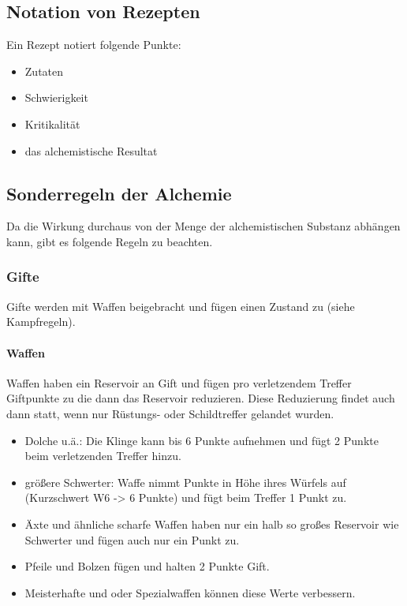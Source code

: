 \documentclass{article}
\begin{document}
\begin{center}
\subsection{Notation von Rezepten}
\end{center}

Ein Rezept notiert folgende Punkte:

\begin{itemize}
\item Zutaten
\item Schwierigkeit
\item Kritikalität
\item das alchemistische Resultat
\end{itemize}

\begin{center}
\subsection{Sonderregeln der Alchemie}
\end{center}

Da die Wirkung durchaus von der Menge der alchemistischen Substanz abhängen kann, gibt es folgende Regeln zu beachten.

\subsubsection{Gifte}

Gifte werden mit Waffen beigebracht und fügen einen Zustand zu (siehe Kampfregeln).

\paragraph{Waffen}

Waffen haben ein Reservoir an Gift und fügen pro verletzendem Treffer Giftpunkte zu die dann das Reservoir reduzieren.
Diese Reduzierung findet auch dann statt, wenn nur Rüstungs- oder Schildtreffer gelandet wurden.

\begin{itemize}
\item Dolche u.ä.: Die Klinge kann bis 6 Punkte aufnehmen und fügt 2 Punkte beim verletzenden Treffer hinzu.
\item größere Schwerter: Waffe nimmt Punkte in Höhe ihres Würfels auf (Kurzschwert W6 -> 6 Punkte) und fügt beim Treffer 1 Punkt zu.
\item Äxte und ähnliche scharfe Waffen haben nur ein halb so großes Reservoir wie Schwerter und fügen auch nur ein Punkt zu.
\item Pfeile und Bolzen fügen und halten 2 Punkte Gift.
\item Meisterhafte und oder Spezialwaffen können diese Werte verbessern.
\end{itemize}
\end{document}

